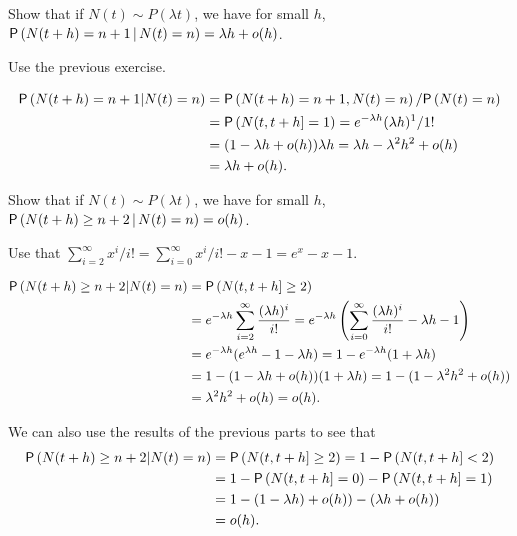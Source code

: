 \begin{exercise}
  Show that if $N(t) \sim P(\lambda t)$, we have for small $h$,
 $\P{N(t+h) = n+1 \given N(t) = n} = \lambda h + o(h)$. 
    \begin{hint} Use the previous exercise.
    \end{hint}
\begin{solution}
  \begin{align*}
  \P{N(t+h) = n +1 | N(t) = n} 
&=  \P{N(t+h) = n +1 , N(t) =n}/\P{N(t) = n}\\
&= \P{N(t, t+h] = 1} = e^{-\lambda h} (\lambda h)^1/1! \\
&= (1-\lambda h + o(h))\lambda h  = \lambda h - \lambda^2 h^2 + o(h) \\
&= \lambda h + o(h). 
  \end{align*}
\end{solution}
\end{exercise}

\begin{exercise}
  Show that if $N(t) \sim P(\lambda t)$, we have for small $h$,
 $\P{N(t+h) \geq n+2 \given N(t) = n} = o(h)$.
    \begin{hint}
 Use that  $\sum_{i=2}^\infty x^i/i! = \sum_{i=0}^\infty x^i/i! - x -1 = e^x -x - 1$.
    \end{hint}
\begin{solution}
  \begin{align*}
  \P{N(t+h) \geq n+2 | N(t) = n} 
&= \P{N(t, t+h] \geq 2} \\
&= e^{-\lambda h} \sum_{i=2}^\infty \frac{(\lambda h)^i}{i!} 
= e^{-\lambda h} \left(\sum_{i=0}^\infty \frac{(\lambda h)^i}{i!} - \lambda h - 1\right)\\
&= e^{-\lambda h}(e^{\lambda h} - 1 - \lambda h) 
= 1 - e^{-\lambda h}(1 + \lambda h) \\
&= 1 - (1-\lambda h + o(h))(1+\lambda h) 
= 1 - (1-\lambda^2 h^2 + o(h)) \\
&= \lambda^2 h^2 + o(h) = o(h).
  \end{align*}

We can also use the results of the previous parts to see that
\begin{align*}
  \P{N(t+h) \geq n+2 | N(t) = n} 
&= \P{N(t, t+h] \geq 2} = 1- \P{N(t, t+h]<2} \\
&= 1 - \P{N(t, t+h]= 0} - \P{N(t, t+h]=1} \\
&= 1 - (1-\lambda h) + o(h) ) - (\lambda h + o(h)) \\
&= o(h).
\end{align*}
\end{solution}
\end{exercise}

